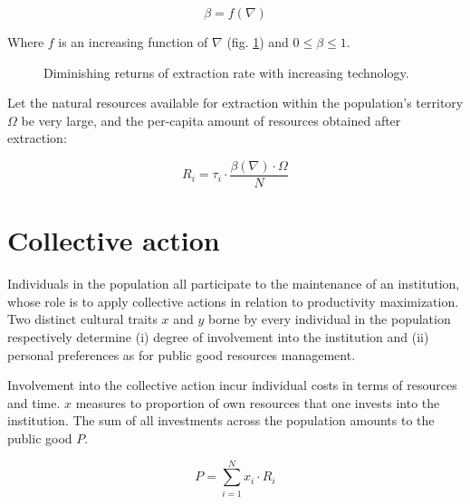 \documentclass[a4paper]{article}
\begin{document}
\begin{equation}
\beta = f(\nabla)
\end{equation}
 
Where $f$ is an increasing function of $\nabla$ (fig. \ref{fig:betafunc}) and $0\leq\beta\leq1$.

\begin{figure}[!htbp]
	\begin{center}
	\end{center}
	\caption{Diminishing returns of extraction rate with increasing technology.}
	\label{fig:betafunc}
\end{figure} 

Let the natural resources available for extraction within the population's territory $\Omega$ be very large, and the per-capita amount of resources obtained after extraction:

\begin{equation} \label{eq:resources}
	R_i = \tau_i\cdot\frac{\beta(\nabla)\cdot\Omega}{N}
\end{equation}

\section{Collective action}
\label{sec:collact}

Individuals in the population all participate to the maintenance of an institution, whose role is to apply collective actions in relation to productivity maximization. Two distinct cultural traits $x$ and $y$ borne by every individual in the population respectively determine (i) degree of involvement into the institution and (ii) personal preferences as for public good resources management.     

Involvement into the collective action incur individual costs in terms of resources and time. $x$ measures to proportion of own resources that one invests into the institution. The sum of all investments across the population amounts to the public good $P$. 

\begin{equation} \label{eq:pubgood}
P = \sum_{i=1}^{N}x_i\cdot R_i
\end{equation}
\end{document}
